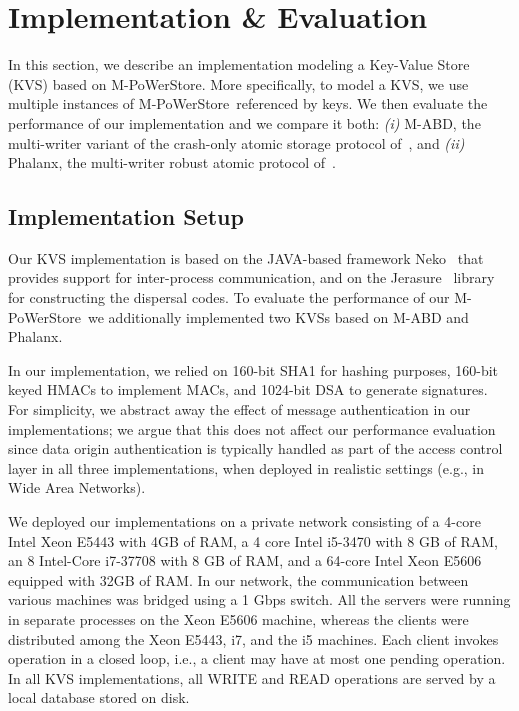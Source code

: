 \documentclass[10pt,conference,compsocconf]{IEEEtran}
\newcommand{\mprotocol}{M-PoWerStore}
\begin{document}
\section{Implementation \& Evaluation}\label{sec:implementation}

In this section, we describe an implementation modeling a Key-Value Store (KVS) based on \mprotocol. More specifically, to model a KVS, we use multiple instances of \mprotocol\ referenced by keys. We then evaluate the performance of our implementation  and we compare it both: \emph{(i)} M-ABD, the multi-writer variant of the crash-only atomic storage protocol of~\cite{ABND95}, and \emph{(ii)} Phalanx, the multi-writer robust atomic protocol of~\cite{Phalanx}.

\subsection{Implementation Setup}\label{subsec:setup}

Our KVS implementation is based on the JAVA-based framework Neko~\cite{Neko09} that provides support for inter-process communication, and on the Jerasure~\cite{Jerasure08} library for constructing the dispersal codes.
To evaluate the performance of our \mprotocol\, we additionally implemented two KVSs  based on M-ABD and Phalanx.


In our implementation, we relied on 160-bit SHA1 for hashing purposes, 160-bit keyed HMACs to implement MACs, and 1024-bit DSA to generate signatures. For simplicity, we abstract away the effect of message authentication in our implementations; we argue that this does not affect our performance evaluation since data origin authentication is typically handled as part of the access control layer in all three implementations, when deployed in realistic settings (e.g., in Wide Area Networks).

We deployed our implementations on a private network consisting of a 4-core Intel Xeon E5443 with 4GB of RAM, a 4 core Intel i5-3470 with 8 GB of RAM,
an 8 Intel-Core i7-37708 with 8 GB of RAM, and a 64-core Intel Xeon E5606 equipped with 32GB of RAM. In our network, the communication between various machines was bridged
using a 1 Gbps switch. All the servers were running in separate processes on the Xeon E5606 machine, whereas the clients were distributed among the Xeon E5443, i7, and the i5 machines. Each client invokes operation in a closed loop, i.e., a client may have at most one pending operation. In all KVS implementations,  all \textsc{WRITE} and \textsc{READ} operations are served by a local database stored on disk.
\end{document}
